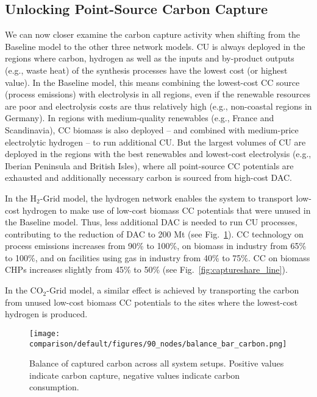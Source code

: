 \documentclass[twocolumn]{article}
\newcommand{\modBase}{Baseline model}
\newcommand{\modCO}{CO$_2$-Grid model}
\newcommand{\modH}{H$_2$-Grid model}
\begin{document}
\subsection*{Unlocking Point-Source Carbon Capture}

We can now closer examine the carbon capture activity when shifting from the \modBase{} to the other three network models.
CU is always deployed in the regions where carbon, hydrogen as well as the inputs and by-product outputs (e.g., waste heat) of the synthesis processes have the lowest cost (or highest value). In the \modBase{}, this means combining the lowest-cost CC source (process emissions) with electrolysis in all regions, even if the renewable resources are poor and electrolysis costs are thus relatively high (e.g., non-coastal regions in Germany). In regions with medium-quality renewables (e.g., France and Scandinavia), CC biomass is also deployed -- and combined with medium-price electrolytic hydrogen -- to run additional CU. But the largest volumes of CU are deployed in the regions with the best renewables and lowest-cost electrolysis (e.g., Iberian Peninsula and British Isles), where all point-source CC potentials are exhausted and additionally necessary carbon is sourced from high-cost DAC.

In the \modH{}, the hydrogen network enables the system to transport low-cost hydrogen to make use of low-cost biomass CC potentials that were unused in the \modBase{}. Thus, less additional DAC is needed to run CU processes, contributing to the reduction of DAC to \label{}200 Mt (see Fig.~\ref{fig:balance_captured_carbon}).
CC technology on process emissions increases from \label{}90\% to \label{}100\%, on biomass in industry from \label{}65\% to \label{}100\%, and on facilities using gas in industry from \label{}40\% to \label{}75\%. CC on biomass CHPs increases slightly from \label{}45\% to \label{}50\% (see Fig.~\ref{fig:captureshare_line}).

In the \modCO{}, a similar effect is achieved by transporting the carbon from unused low-cost biomass CC potentials to the sites where the lowest-cost hydrogen is produced.

\begin{figure}[ht!]
    \centering
    \texttt{[image: comparison/default/figures/90\_nodes/balance\_bar\_carbon.png]}
    \caption{Balance of captured carbon across all system setups. Positive values indicate carbon capture, negative values indicate carbon consumption.}
    \label{fig:balance_captured_carbon}
\end{figure}
\end{document}
